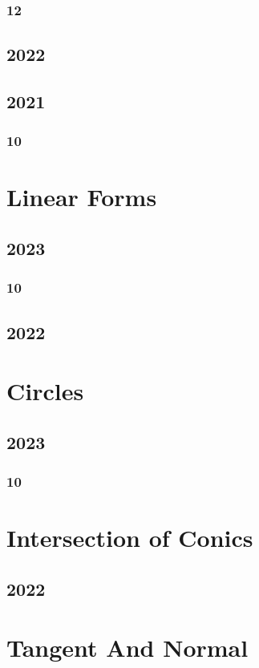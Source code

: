 \documentclass[11pt]{book}
\begin{document}
\subsection{12}

\section{2022}

\section{2021}
\subsection{10}

\chapter{Linear Forms}
\section{2023}
\subsection{10}

\section{2022}

\chapter{Circles}
\section{2023}
\subsection{10}

\chapter{Intersection of Conics}
\section{2022}

\chapter{Tangent And Normal}
\end{document}
